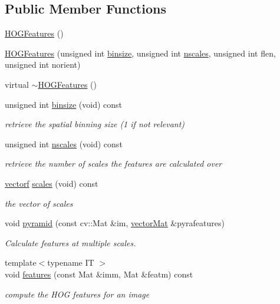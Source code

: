 \subsection*{\-Public \-Member \-Functions}
\begin{DoxyCompactItemize}
\item 
\hyperlink{classHOGFeatures_a323944dc2065bfb4d7b83bac6ea0ba69}{\-H\-O\-G\-Features} ()
\item 
\hyperlink{classHOGFeatures_a0a423cc8897fa7fa7ce0a4f9679035cf}{\-H\-O\-G\-Features} (unsigned int \hyperlink{classHOGFeatures_ab4511627f2000a34350d558d6f14425d}{binsize}, unsigned int \hyperlink{classHOGFeatures_a071022517cf2e11c33fa07088f35c228}{nscales}, unsigned int flen, unsigned int norient)
\item 
virtual \hyperlink{classHOGFeatures_a062d1cfbb82dbd2829e844a937490509}{$\sim$\-H\-O\-G\-Features} ()
\item 
unsigned int \hyperlink{classHOGFeatures_ab4511627f2000a34350d558d6f14425d}{binsize} (void) const 
\begin{DoxyCompactList}\small\item\em retrieve the spatial binning size (1 if not relevant) \end{DoxyCompactList}\item 
unsigned int \hyperlink{classHOGFeatures_a071022517cf2e11c33fa07088f35c228}{nscales} (void) const 
\begin{DoxyCompactList}\small\item\em retrieve the number of scales the features are calculated over \end{DoxyCompactList}\item 
\hyperlink{types_8hpp_a4da5db3ee9e284f719ef5764dbadffc8}{vectorf} \hyperlink{classHOGFeatures_ad9668fda860881c676e1d1bd70adc18c}{scales} (void) const 
\begin{DoxyCompactList}\small\item\em the vector of scales \end{DoxyCompactList}\item 
void \hyperlink{classHOGFeatures_a509372c4e652c3fc97f2d2be75fecd4d}{pyramid} (const cv\-::\-Mat \&im, \hyperlink{types_8hpp_a3207a7addcfa415d1c83622febcb1e9b}{vector\-Mat} \&pyrafeatures)
\begin{DoxyCompactList}\small\item\em \-Calculate features at multiple scales. \end{DoxyCompactList}\item 
{\footnotesize template$<$typename I\-T $>$ }\\void \hyperlink{classHOGFeatures_a0cabf74792b44e23e3dfd2c388b12036}{features} (const \-Mat \&imm, \-Mat \&featm) const 
\begin{DoxyCompactList}\small\item\em compute the \-H\-O\-G features for an image \end{DoxyCompactList}\end{DoxyCompactItemize}
